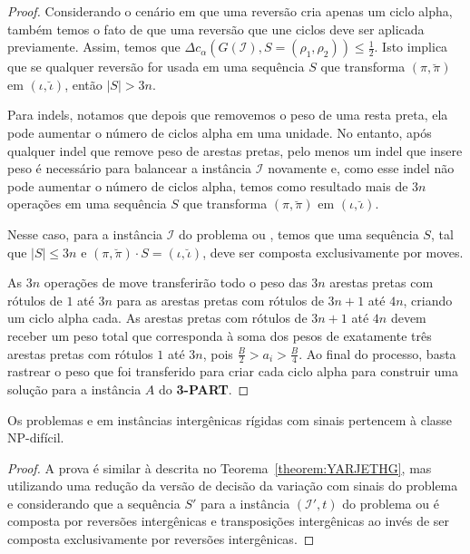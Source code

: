 \begin{proof}
Considerando o cenário em que uma reversão cria apenas um ciclo alpha, também temos o fato de que uma reversão que une ciclos deve ser aplicada previamente. Assim, temos que $\Delta c_{\alpha}(G(\mathcal{I}), S=(\rho_1,\rho_2)) \le \frac{1}{2}$. Isto implica que se qualquer reversão for usada em uma sequência $S$ que transforma $(\pi,\breve\pi)$ em $(\iota,\breve\iota)$, então $|S| > 3n$.

Para indels, notamos que depois que removemos o peso de uma resta preta, ela pode aumentar o número de ciclos alpha em uma unidade. No entanto, após qualquer indel que remove peso de arestas pretas, pelo menos um indel que insere peso é necessário para balancear a instância $\mathcal{I}$ novamente e, como esse indel não pode aumentar o número de ciclos alpha, temos como resultado mais de $3n$ operações em uma sequência $S$ que transforma $(\pi,\breve\pi)$ em $(\iota,\breve\iota)$. 

Nesse caso, para a instância $\mathcal{I}$ do problema \SbIRM{} ou \SbIRMI{}, temos que uma sequência $S$, tal que $|S| \le 3n$ e $(\pi,\breve\pi) \cdot S = (\iota,\breve\iota)$, deve ser composta exclusivamente por moves.

As $3n$ operações de move transferirão todo o peso das $3n$ arestas pretas com rótulos de $1$ até $3n$ para as arestas pretas com rótulos de $3n+1$ até $4n$, criando um ciclo alpha cada. As arestas pretas com rótulos de $3n+1$ até $4n$ devem receber um peso total que corresponda à soma dos pesos de exatamente três arestas pretas com rótulos $1$ até $3n$, pois $\frac{B}{2} > a_i > \frac{B}{4}$. Ao final do processo, basta rastrear o peso que foi transferido para criar cada ciclo alpha para construir uma solução para a instância $A$ do \textbf{3-PART}.
\end{proof}


\begin{theorem}\label{theorem:YACBNPHO}
Os problemas \SbIRTI{} e \SbIRTMI{} em instâncias intergênicas rígidas com sinais pertencem à classe NP-difícil.
\end{theorem}
\begin{proof}
A prova é similar à descrita no Teorema~\ref{theorem:YARJETHG}, mas utilizando uma redução da versão de decisão da variação com sinais do problema \SbRT{} e considerando que a sequência $S'$ para a instância $(\mathcal{I'},t)$ do problema \SbIRTI{} ou \SbIRTMI{} é composta por reversões intergênicas e transposições intergênicas ao invés de ser composta exclusivamente por reversões intergênicas.
\end{proof}

